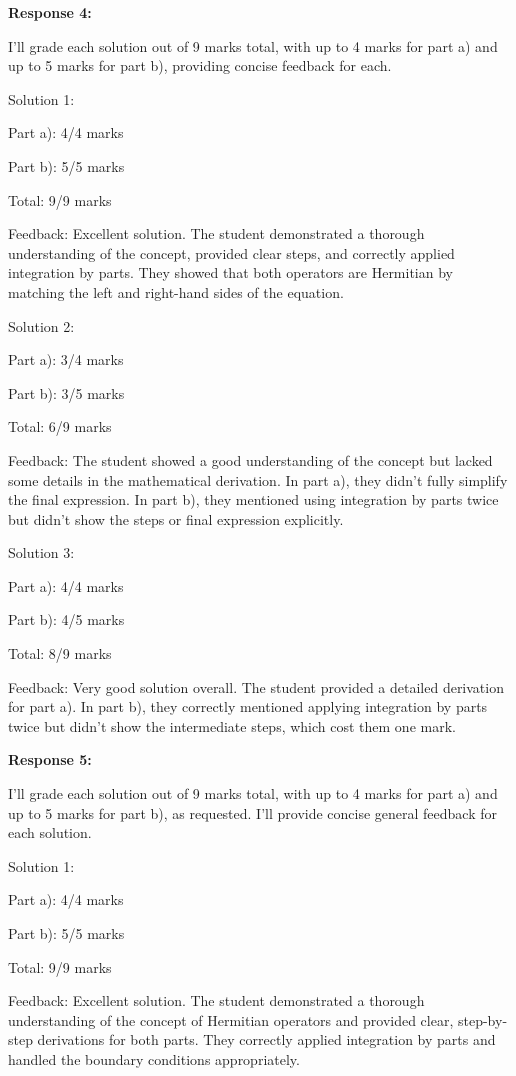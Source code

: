 \documentclass[a4paper,11pt]{article}
\begin{document}
\bigskip
\textbf{Response 4:}

I'll grade each solution out of 9 marks total, with up to 4 marks for part a) and up to 5 marks for part b), providing concise feedback for each.

Solution 1:

Part a): 4/4 marks

Part b): 5/5 marks

Total: 9/9 marks

Feedback: Excellent solution. The student demonstrated a thorough understanding of the concept, provided clear steps, and correctly applied integration by parts. They showed that both operators are Hermitian by matching the left and right-hand sides of the equation.

Solution 2:

Part a): 3/4 marks

Part b): 3/5 marks

Total: 6/9 marks

Feedback: The student showed a good understanding of the concept but lacked some details in the mathematical derivation. In part a), they didn't fully simplify the final expression. In part b), they mentioned using integration by parts twice but didn't show the steps or final expression explicitly.

Solution 3:

Part a): 4/4 marks

Part b): 4/5 marks

Total: 8/9 marks

Feedback: Very good solution overall. The student provided a detailed derivation for part a). In part b), they correctly mentioned applying integration by parts twice but didn't show the intermediate steps, which cost them one mark.

\bigskip
\textbf{Response 5:}

I'll grade each solution out of 9 marks total, with up to 4 marks for part a) and up to 5 marks for part b), as requested. I'll provide concise general feedback for each solution.

Solution 1:

Part a): 4/4 marks

Part b): 5/5 marks

Total: 9/9 marks

Feedback: Excellent solution. The student demonstrated a thorough understanding of the concept of Hermitian operators and provided clear, step-by-step derivations for both parts. They correctly applied integration by parts and handled the boundary conditions appropriately.
\end{document}
